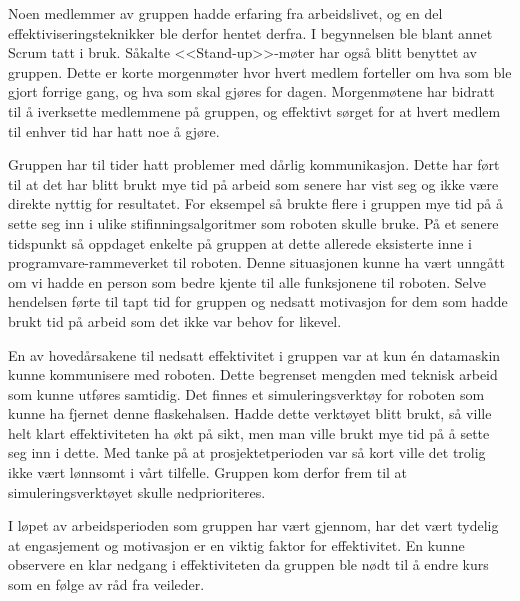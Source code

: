 Noen medlemmer av gruppen hadde erfaring fra arbeidslivet, og en del effektiviseringsteknikker ble derfor hentet derfra. I begynnelsen ble blant annet Scrum \cite{scrum} tatt i bruk.  Såkalte <<Stand-up>>-møter har også blitt benyttet av gruppen. Dette er korte morgenmøter hvor hvert medlem forteller om hva som ble gjort forrige gang, og hva som skal gjøres for dagen. Morgenmøtene har bidratt til å iverksette medlemmene på gruppen, og effektivt sørget for at hvert medlem til enhver tid har hatt noe å gjøre.

Gruppen har til tider hatt problemer med dårlig kommunikasjon. Dette har ført til at det har blitt brukt mye tid på arbeid som senere har vist seg og ikke være direkte nyttig for resultatet. For eksempel så brukte flere i gruppen mye tid på å sette seg inn i ulike stifinnings\-algoritmer som roboten skulle bruke. På et senere tidspunkt så oppdaget enkelte på gruppen at dette allerede eksisterte inne i programvare-rammeverket til roboten. Denne situasjonen kunne ha vært unngått om vi hadde en person som bedre kjente til alle funksjonene til roboten. Selve hendelsen førte til tapt tid for gruppen og nedsatt motivasjon for dem som hadde brukt tid på arbeid som det ikke var behov for likevel. 

En av hovedårsakene til nedsatt effektivitet i gruppen var at kun én datamaskin kunne kommunisere med roboten. Dette begrenset mengden med teknisk arbeid som kunne utføres samtidig. Det finnes et simuleringsverktøy for roboten som kunne ha fjernet denne flaskehalsen. Hadde dette verktøyet blitt brukt, så ville helt klart effektiviteten ha økt på sikt, men man ville brukt mye tid på å sette seg inn i dette. Med tanke på at prosjektetperioden var så kort ville det trolig ikke vært lønnsomt i vårt tilfelle. Gruppen kom derfor frem til at simuleringsverktøyet skulle nedprioriteres.

I løpet av arbeidsperioden som gruppen har vært gjennom, har det vært tydelig at engasjement og motivasjon er en viktig faktor for effektivitet. En kunne observere en klar nedgang i effektiviteten da gruppen ble nødt til å endre kurs som en følge av råd fra veileder. 



